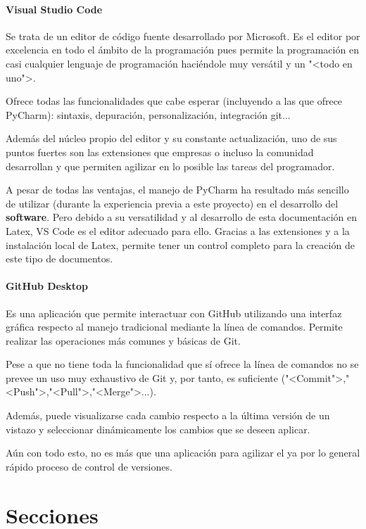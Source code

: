 \paragraph{Visual Studio Code}
Se trata de un editor de código fuente desarrollado por Microsoft. Es el editor
por excelencia en todo el ámbito de la programación pues permite la programación
en casi cualquier lenguaje de programación haciéndole muy versátil y un "<todo
en uno">.

Ofrece todas las funcionalidades que cabe esperar (incluyendo a las que ofrece
PyCharm): sintaxis, depuración, personalización, integración git...

Además del núcleo propio del editor y su constante actualización, uno de sus
puntos fuertes son las extensiones que empresas o incluso la comunidad
desarrollan y que permiten agilizar en lo posible las tareas del programador.

A pesar de todas las ventajas, el manejo de PyCharm ha resultado más sencillo de
utilizar (durante la experiencia previa a este proyecto) en el desarrollo del
\textbf{software}. Pero debido a su versatilidad y al desarrollo de esta
documentación en Latex, VS Code es el editor adecuado para ello. Gracias a las
extensiones y a la instalación local de Latex, permite tener un control completo
para la creación de este tipo de documentos. 


\paragraph{GitHub Desktop}
Es una aplicación que permite interactuar con GitHub utilizando una interfaz
gráfica respecto al manejo tradicional mediante la línea de comandos. Permite
realizar las operaciones más comunes y básicas de Git.

Pese a que no tiene toda la funcionalidad que sí ofrece la línea de comandos no
se prevee un uso muy exhaustivo de Git y, por tanto, es suficiente
("<Commit">,"<Push">,"<Pull">,"<Merge">...).

Además, puede visualizarse cada cambio respecto a la última versión de un
vistazo y seleccionar dinámicamente los cambios que se deseen aplicar.

Aún con todo esto, no es más que una aplicación para agilizar el ya por lo
general rápido proceso de control de versiones.

\section{Secciones}

